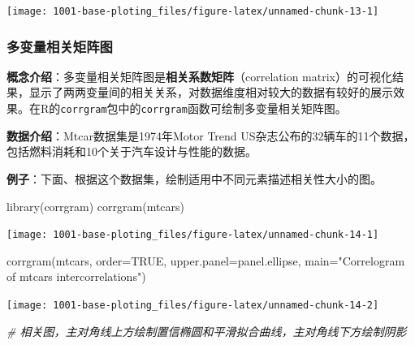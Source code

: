 \documentclass[
]{book}
\newenvironment{Shaded}{\begin{snugshade}}{\end{snugshade}}
\newcommand{\AttributeTok}[1]{\textcolor[rgb]{0.77,0.63,0.00}{#1}}
\newcommand{\CommentTok}[1]{\textcolor[rgb]{0.56,0.35,0.01}{\textit{#1}}}
\newcommand{\ConstantTok}[1]{\textcolor[rgb]{0.00,0.00,0.00}{#1}}
\newcommand{\FunctionTok}[1]{\textcolor[rgb]{0.00,0.00,0.00}{#1}}
\newcommand{\NormalTok}[1]{#1}
\newcommand{\StringTok}[1]{\textcolor[rgb]{0.31,0.60,0.02}{#1}}
\begin{document}
\begin{center}\texttt{[image: 1001-base-ploting\_files/figure-latex/unnamed-chunk-13-1]} \end{center}

\hypertarget{ux591aux53d8ux91cfux76f8ux5173ux77e9ux9635ux56fe}{%
\subsubsection{多变量相关矩阵图}\label{ux591aux53d8ux91cfux76f8ux5173ux77e9ux9635ux56fe}}

\textbf{概念介绍}：多变量相关矩阵图是\textbf{相关系数矩阵}（correlation matrix）的可视化结果，显示了两两变量间的相关关系，对数据维度相对较大的数据有较好的展示效果。在R的\texttt{corrgram}包中的\texttt{corrgram}函数可绘制多变量相关矩阵图。

\textbf{数据介绍}：Mtcar数据集是1974年Motor Trend US杂志公布的32辆车的11个数据，包括燃料消耗和10个关于汽车设计与性能的数据。

\textbf{例子}：下面、根据这个数据集，绘制适用中不同元素描述相关性大小的图。

\begin{Shaded}
\begin{Highlighting}[]
\FunctionTok{library}\NormalTok{(corrgram) }
\FunctionTok{corrgram}\NormalTok{(mtcars)}
\end{Highlighting}
\end{Shaded}

\begin{center}\texttt{[image: 1001-base-ploting\_files/figure-latex/unnamed-chunk-14-1]} \end{center}

\begin{Shaded}
\begin{Highlighting}[]
\FunctionTok{corrgram}\NormalTok{(mtcars, }\AttributeTok{order=}\ConstantTok{TRUE}\NormalTok{, }\AttributeTok{upper.panel=}\NormalTok{panel.ellipse, }
         \AttributeTok{main=}\StringTok{"Correlogram of mtcars intercorrelations"}\NormalTok{) }
\end{Highlighting}
\end{Shaded}

\begin{center}\texttt{[image: 1001-base-ploting\_files/figure-latex/unnamed-chunk-14-2]} \end{center}

\begin{Shaded}
\begin{Highlighting}[]
\CommentTok{\# 相关图，主对角线上方绘制置信椭圆和平滑拟合曲线，主对角线下方绘制阴影}
\end{Highlighting}
\end{Shaded}
\end{document}
